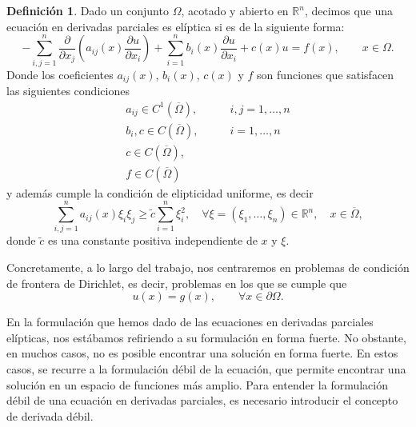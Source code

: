 \documentclass[a4paper,11pt,spanish, twoside, leqno]{tfg-uam}
\theoremstyle{definition}
\newtheorem{defin}[teor]{Definici\'on}
\begin{document}
\begin{mdframed}
\begin{defin}\label{def:EDP_eliptica}
    Dado un conjunto $\Omega$, acotado y abierto en $\mathbb{R}^n$, decimos que una ecuación en derivadas parciales es elíptica si es de la siguiente forma:
    \begin{equation}\label{eq:EDP_eliptica}
        -\sum_{i,j=1}^{n} \frac{\partial}{\partial x_j}\left( a_{ij}(x)\frac{\partial u}{\partial x_i}\right) + \sum_{i=1}^{n} b_i(x)\frac{\partial u}{\partial x_i} + c(x)u = f(x), \qquad x\in\Omega.
    \end{equation}
    Donde los coeficientes $a_{ij}(x)$, $b_i(x)$, $c(x)$ y $f$ son funciones que satisfacen las siguientes condiciones
    \begin{align}
        a_{ij} \in C^1(\overline{\Omega}),& \qquad i,j = 1, \dots ,n \label{eq:condiciones_EDP_eliptica_a} \\
        b_i, c \in C(\overline{\Omega}),& \qquad i = 1, \dots ,n \\
        c \in C(\overline{\Omega}),& \\
        f\in C(\overline{\Omega})&\label{eq:condiciones_EDP_eliptica_f}
    \end{align}
    y además cumple la condición de elipticidad uniforme, es decir
    \begin{equation}\label{eq:condiciones_EDP_eliptica_elipticidad_uniforme}
        \sum_{i,j=1}^n a_{ij}(x) \xi_i \xi_j \geq \tilde{c} \sum_{i=1}^n \xi_i^2, \quad \forall \xi = (\xi_1, \ldots, \xi_n) \in \mathbb{R}^n, \quad x \in \overline{\Omega},
    \end{equation}
    donde $\tilde{c}$ es una constante positiva independiente de $x$ y $\xi$.
\end{defin}
\end{mdframed}

Concretamente, a lo largo del trabajo, nos centraremos en problemas de condición de frontera de Dirichlet, es decir, problemas en los que se cumple que
\begin{equation}
    u(x) = g(x), \qquad \forall x\in\partial\Omega.
\end{equation}

En la formulación que hemos dado de las ecuaciones en derivadas parciales elípticas, nos estábamos refiriendo a su formulación en forma fuerte. No obstante, en muchos casos, no es posible encontrar una solución en forma fuerte. En estos casos, se recurre a la  formulación débil de la ecuación, que permite encontrar una solución en un espacio de funciones más amplio. Para entender la formulación débil de una ecuación en derivadas parciales, es necesario introducir el concepto de derivada débil.
\end{document}
